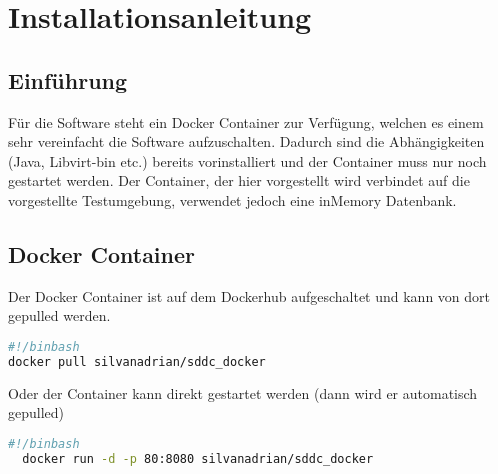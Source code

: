 \chapter{Installationsanleitung}
\section{Einführung}
Für die Software steht ein Docker Container zur Verfügung, welchen es einem sehr 
vereinfacht die Software aufzuschalten.
Dadurch sind die Abhängigkeiten (Java, Libvirt-bin etc.) bereits vorinstalliert 
und der Container muss nur noch gestartet werden.
Der Container, der hier vorgestellt wird verbindet auf die vorgestellte 
Testumgebung, verwendet jedoch eine inMemory Datenbank.

\section{Docker Container}
Der Docker Container ist auf dem Dockerhub aufgeschaltet und kann von dort 
gepulled werden.
\begin{lstlisting}[language=bash,caption={Pull Docker Container}]
#!/binbash
docker pull silvanadrian/sddc_docker
\end{lstlisting}
Oder der Container kann direkt gestartet werden (dann wird er automatisch gepulled)

\begin{lstlisting}[language=bash,caption={Run Docker Container}]
  #!/binbash
  docker run -d -p 80:8080 silvanadrian/sddc_docker
\end{lstlisting}